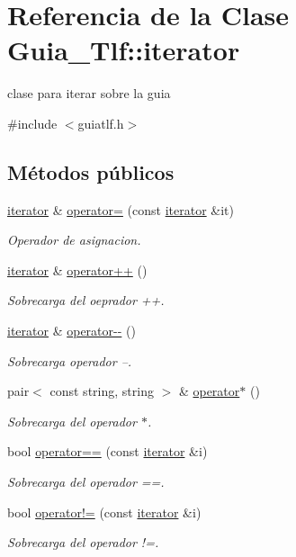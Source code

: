\hypertarget{classGuia__Tlf_1_1iterator}{}\section{Referencia de la Clase Guia\+\_\+\+Tlf\+:\+:iterator}
\label{classGuia__Tlf_1_1iterator}


clase para iterar sobre la guia  




{\ttfamily \#include $<$guiatlf.\+h$>$}

\subsection*{Métodos públicos}
\begin{DoxyCompactItemize}
\item 
\hyperlink{classGuia__Tlf_1_1iterator}{iterator} \& \hyperlink{classGuia__Tlf_1_1iterator_ac23d53e2211c9e379d910b4ca6354a1c}{operator=} (const \hyperlink{classGuia__Tlf_1_1iterator}{iterator} \&it)
\begin{DoxyCompactList}\small\item\em Operador de asignacion. \end{DoxyCompactList}\item 
\hyperlink{classGuia__Tlf_1_1iterator}{iterator} \& \hyperlink{classGuia__Tlf_1_1iterator_a4edb22003e51ce05bb2be0e0f0f9334d}{operator++} ()
\begin{DoxyCompactList}\small\item\em Sobrecarga del oeprador ++. \end{DoxyCompactList}\item 
\hyperlink{classGuia__Tlf_1_1iterator}{iterator} \& \hyperlink{classGuia__Tlf_1_1iterator_a40654c62e5d7fa0c88f41cc8248cba44}{operator-\/-\/} ()
\begin{DoxyCompactList}\small\item\em Sobrecarga operador --. \end{DoxyCompactList}\item 
pair$<$ const string, string $>$ \& \hyperlink{classGuia__Tlf_1_1iterator_a677ada958ed6f7f65c29f2d12b6e35b6}{operator$\ast$} ()
\begin{DoxyCompactList}\small\item\em Sobrecarga del operador $\ast$. \end{DoxyCompactList}\item 
bool \hyperlink{classGuia__Tlf_1_1iterator_ab4b046aff7151ba197b789091b65aa49}{operator==} (const \hyperlink{classGuia__Tlf_1_1iterator}{iterator} \&i)
\begin{DoxyCompactList}\small\item\em Sobrecarga del operador ==. \end{DoxyCompactList}\item 
bool \hyperlink{classGuia__Tlf_1_1iterator_aa7f7981ca6aec075d47618b136904682}{operator!=} (const \hyperlink{classGuia__Tlf_1_1iterator}{iterator} \&i)
\begin{DoxyCompactList}\small\item\em Sobrecarga del operador !=. \end{DoxyCompactList}\end{DoxyCompactItemize}

